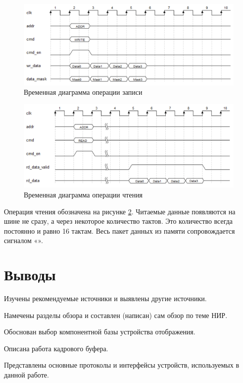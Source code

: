 \begin{figure}[ht]
    \centering
    \includegraphics[scale=0.5]{res/img/psram_write.png}
    \caption{Временная диаграмма операции записи \cite{gowin:GW1NSR}}
    \label{fig:psram_write}
\end{figure}

\begin{figure}[ht]
    \centering
    \includegraphics[scale=0.5]{res/img/psram_read.png}
    \caption{Временная диаграмма операции чтения \cite{gowin:GW1NSR}}
    \label{fig:psram_read}
\end{figure}

Операция чтения обозначена на рисунке \ref{fig:psram_read}. Читаемые данные появляются на шине не сразу, а через некоторое количество тактов. Это количество всегда постоянно и равно 16 тактам. Весь пакет данных из памяти сопровождается сигналом «».

\section{Выводы}

\begin{packed_enum}
\item Изучены рекомендуемые источники и выявлены другие источники.
\item Намечены разделы обзора и составлен (написан) сам обзор по теме НИР.
\item Обоснован выбор компонентной базы устройства отображения.
\item Описана работа кадрового буфера.
\item Представлены основные протоколы и интерфейсы устройств, используемых в данной работе.
\end{packed_enum}

\nocite{vhdl:specification}
